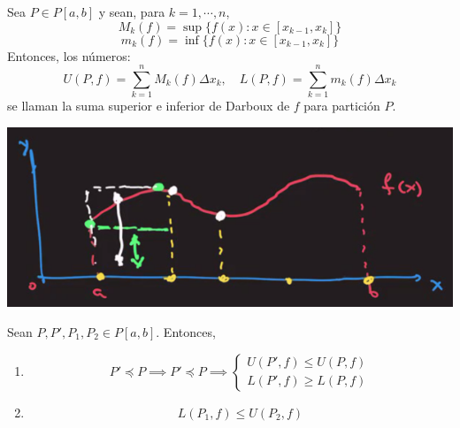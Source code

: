 \begin{definicion}
	Sea $P\in P[a,b]$ y sean, para $k=1,\cdots, n$, 
	$$M_k(f)=\sup\{f(x): x\in [x_{k-1},x_k]\}$$
	$$m_k(f)=\inf\{f(x):x\in [x_{k-1},x_k]\}$$
	Entonces, los números: 
	$$U(P,f)=\sum_{k=1}^{n}M_k(f)\Delta x_k,\quad L(P,f)=\sum_{k=1}^{n}m_k(f)\Delta x_k$$
	se llaman la suma superior e inferior de Darboux de $f$ para partición $P$. 
		\begin{center}
		\includegraphics[scale=0.5]{images/1/2}
	\end{center}
\end{definicion}

\begin{prop}
	Sean $P,P',P_1,P_2\in P[a,b]$. Entonces, 
	\begin{enumerate}
		\item $$P'\preceq P\implies 
			P'\preceq P\implies \begin{cases}
				U(P',f)\leqslant U(P,f)\\
				L(P',f)\geqslant L(P,f)
		\end{cases}$$
	\item $$L(P_1,f)\leq U(P_2,f)$$
	\end{enumerate}
\end{prop}

